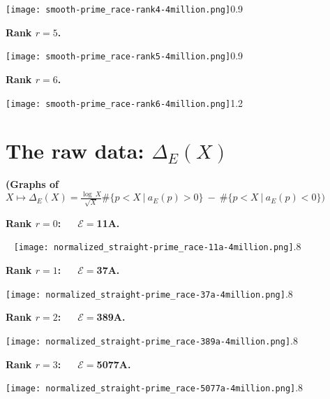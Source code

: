 \documentclass[11pt]{article}
\theoremstyle{plain}
\theoremstyle{definition}
\numberwithin{equation}{section}
\numberwithin{figure}{section}
\numberwithin{table}{section}
\begin{document}
     \texttt{[image: smooth-prime\_race-rank4-4million.png]}{0.9}~\label{sr4}

 \newpage


  \centerline{\bf Rank $r=5$.}


     \texttt{[image: smooth-prime\_race-rank5-4million.png]}{0.9}~\label{sr5}


  \vskip30pt


  \centerline{\bf Rank $r=6$.}


 \vskip20pt



     \texttt{[image: smooth-prime\_race-rank6-4million.png]}{1.2}~\label{sr6}
      \newpage
\section{The raw data: $\Delta_E(X)$}
\vskip40pt

  \centerline{\bf (Graphs of \ \   $X\mapsto \Delta_E(X)=  {\frac{\log\ X}{\sqrt X}}\#\{ p < X\ | \ a_E(p) > 0\}\ - \ \#\{ p < X\ | \  a_E(p) < 0\})$}  \vskip40pt


 \centerline{\bf Rank $r=0$:\ \ \  ${\mathcal E}=$11A.}~ \texttt{[image: normalized\_straight-prime\_race-11a-4million.png]}{.8}~\label{nr11}


\vskip40pt



  \centerline{\bf Rank $r=1$:\ \ \  ${\mathcal E}=$37A.}


 \vskip60pt



     \texttt{[image: normalized\_straight-prime\_race-37a-4million.png]}{.8}~\label{nr37}
%

  \vskip40pt



  \centerline{\bf Rank $r=2$:\ \ \  ${\mathcal E}=$389A.}


  \vskip20pt



     \texttt{[image: normalized\_straight-prime\_race-389a-4million.png]}{.8}~\label{nr389}


   \vskip60pt


  \centerline{\bf Rank $r=3$:\ \ \  ${\mathcal E}=$5077A.}




     \texttt{[image: normalized\_straight-prime\_race-5077a-4million.png]}{.8}~\label{nr389}
\end{document}
